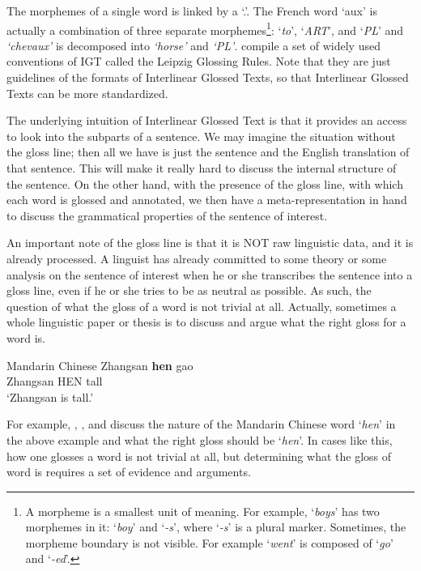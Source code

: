 \documentclass[final]{ua-thesis}
\begin{document}
The morphemes of a single word is linked by a `.'. The French word `aux' is actually a combination of three separate morphemes\footnote{A morpheme is a smallest unit of meaning. For example, `\textit{boys}' has two morphemes in it: `\textit{boy}' and `\textit{-s}', where `\textit{-s}' is a plural marker. Sometimes, the morpheme boundary is not visible. For example `\textit{went}' is composed of `\textit{go}' and `\textit{-ed}'.}: `\textit{to}', `\textit{ART}', and `\textit{PL}' and \textit{`chevaux'} is decomposed into \textit{`horse'} and \textit{`PL'}.   
\citet{bickel2008leipzig} compile a set of widely used conventions of IGT called the Leipzig Glossing Rules.
Note that they are just guidelines of the formats of Interlinear Glossed Texts, so that Interlinear Glossed Texts can be more standardized. 

The underlying intuition of Interlinear Glossed Text is that it provides an access to look into the subparts of a sentence. We may imagine the situation without the gloss line; then all we have is just the sentence and the English translation of that sentence. This will make it really hard to discuss the internal structure of the sentence. On the other hand, with the presence of the gloss line, with which each word is glossed and annotated, we then have a meta-representation in hand to discuss the grammatical properties of the sentence of interest.  
 
An important note of the gloss line is that it is NOT raw linguistic data, and it is already processed. A linguist has already committed to some theory or some analysis on the sentence of interest when he or she transcribes the sentence into a gloss line, even if he or she tries to be as neutral as possible. As such, the question of what the gloss of a word is not trivial at all. Actually, sometimes a whole linguistic paper or thesis is to discuss and argue what the right gloss for a word is.  

\begin{exe}  
\ex Mandarin Chinese
	\gll   Zhangsan \textbf{hen} gao\\
     	   Zhangsan HEN tall\\
    \glt   `Zhangsan is tall.'  
\end{exe}  

For example, \citet{grano2008mandarin}, \citet{Chen2010}, and \citet{liu2010positive} discuss the nature of the Mandarin Chinese word `\textit{hen}' in the above example and what the right gloss should be `\textit{hen}'. In cases like this, how one glosses a word is not trivial at all, but determining what the gloss of word is requires a set of evidence and arguments. 
\end{document}
